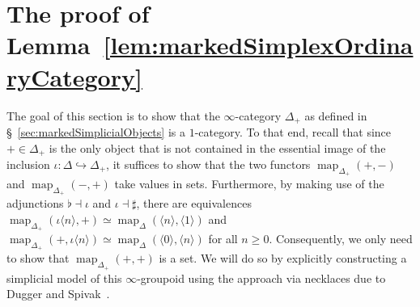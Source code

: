 \documentclass[reqno]{amsart}
\numberwithin{equation}{subsection}
\theoremstyle{plain}
\theoremstyle{definition}
\let\into=\hookrightarrow
\DeclareMathOperator{\Map}{map}
\newcommand{\ord}[1]{\langle#1\rangle}
\newcommand{\map}[1]{\Map_{#1}}
\begin{document}
\section{The proof of Lemma~\ref{lem:markedSimplexOrdinaryCategory}}
\label{sec:appA}
The goal of this section is to show that the  $\infty$-category $\Delta_+$ as defined in \S~\ref{sec:markedSimplicialObjects} is a $1$-category. To that end, recall that since $+\in\Delta_+$ is the only object that is not contained in the essential image of the inclusion $\iota\colon\Delta\into\Delta_+$, it suffices to show that the two functors $\map{\Delta_+}(+,-)$ and $\map{\Delta_+}(-,+)$ take values in sets. Furthermore, by making use of the adjunctions $\flat\dashv \iota$ and $\iota \dashv\sharp$, there are equivalences $\map{\Delta_+}(\iota \ord{n},+)\simeq \map{\Delta}(\ord{n},\ord{1})$ and $\map{\Delta_+}(+,\iota \ord{n})\simeq\map{\Delta}(\ord{0},\ord{n})$ for all $n\geq 0$. Consequently, we only need to show that $\map{\Delta_+}(+,+)$ is a set. We will do so by explicitly constructing a simplicial model of this $\infty$-groupoid using the approach via necklaces due to Dugger and Spivak~\cite{Dugger2011}.
\end{document}
